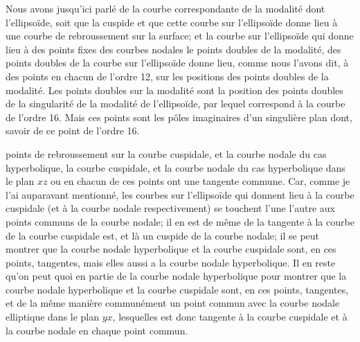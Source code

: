 \documentclass[11pt,a4paper]{article}
\begin{document}
Nous avons jusqu'ici parlé de la courbe correspondante de la modalité dont l'ellipsoïde, soit que la cuspide et que cette courbe sur l'ellipsoïde donne lieu à une courbe de rebroussement sur la surface; et la courbe sur l'ellipsoïde qui donne lieu à des points fixes des courbes nodales le points doubles de la modalité, des points doubles de la courbe sur l'ellipsoïde donne lieu, comme nous l'avons dit, à des points en chacun de l'ordre 12, sur les positions des points doubles de la modalité. Les points doubles sur la modalité sont la position des points doubles de la singularité de la modalité de l'ellipsoïde, par lequel correspond à la courbe de l'ordre 16. Mais ces points sont les pôles imaginaires d'un singulière plan dont, savoir de ce point de l'ordre 16.

\setcounter{page}{131}

points de rebroussement sur la courbe cuspidale, et la courbe nodale du cas hyperbolique, la courbe cuspidale, et la courbe nodale du cas hyperbolique dans le plan $xz$ ou en chacun de ces points ont une tangente commune. Car, comme je l'ai auparavant mentionné, les courbes sur l'ellipsoïde qui donnent lieu à la courbe cuspidale (et à la courbe nodale respectivement) se touchent l'une l'autre aux points communs de la courbe nodale; il en est de même de la tangente à la courbe de la courbe cuspidale est, et là un cuspide de la courbe nodale; il se peut montrer que la courbe nodale hyperbolique et la courbe cuspidale sont, en ces points, tangentes, mais elles aussi a la courbe nodale hyperbolique. Il en reste qu'on peut quoi en partie de la courbe nodale hyperbolique pour montrer que la courbe nodale hyperbolique et la courbe cuspidale sont, en ces points, tangentes, et de la même manière communément un point commun avec la courbe nodale elliptique dans le plan $yx$, lesquelles est donc tangente à la courbe cuspidale et à la courbe nodale en chaque point commun.

\setcounter{page}{132}
\end{document}
